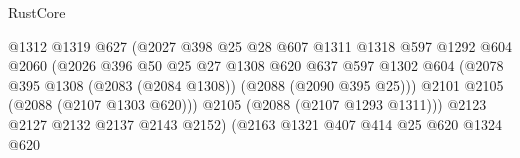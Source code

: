 \begin{lexlean}{RustCore}
\begin{coremodule}
                                            @1312
                                            @1319
                                            @627
                                            (@2027
                                              @398
                                              @25
                                              @28
                                              @607
                                              @1311
                                              @1318
                                              @597
                                              @1292
                                              @604
                                              @2060
                                              (@2026
                                                @396
                                                @50
                                                @25
                                                @27
                                                @1308
                                                @620
                                                @637
                                                @597
                                                @1302
                                                @604
                                                (@2078
                                                  @395
                                                  @1308
                                                  (@2083 (@2084 @1308))
                                                  (@2088 (@2090 @395 @25)))
                                                @2101
                                                @2105
                                                (@2088 (@2107 @1303 @620)))
                                              @2105
                                              (@2088 (@2107 @1293 @1311)))
                                            @2123
                                            @2127
                                            @2132
                                            @2137
                                            @2143
                                            @2152)
                                          (@2163
                                            @1321
                                            @407
                                            @414
                                            @25
                                            @620
                                            @1324
                                            @620

\end{coremodule}
\end{lexlean}
